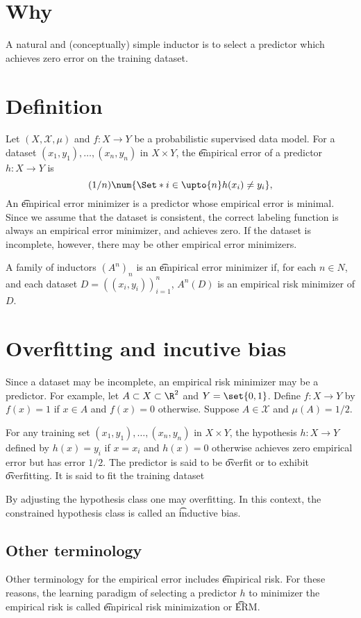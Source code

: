 

\section*{Why}

A natural and (conceptually) simple inductor is to select a predictor which achieves zero error on the training dataset.

\section*{Definition}

Let $(X, \mathcal{X} , \mu )$ and $f: X \to Y$ be a probabilistic supervised data model.
For a dataset $(x_1, y_1), \dots , (x_n, y_n)$ in $X \times Y$, the \t{empirical error} of a predictor $h: X \to Y$ is
    \[
(1/n)\num{\Set*{i \in \upto{n}}{h(x_i) \neq y_i}},
    \]
An \t{empirical error minimizer} is a predictor whose empirical error is minimal.
Since we assume that the dataset is consistent, the correct labeling function is always an empirical error minimizer, and achieves zero.
If the dataset is incomplete, however, there may be other empirical error minimizers.

A family of inductors $(A^n)_n$ is an \t{empirical error minimizer} if, for each $n \in N$, and each dataset $D = ((x_i, y_i))_{i = 1}^{n}$, $A^n(D)$ is an empirical risk minimizer of $D$.

\section*{Overfitting and incutive bias}

Since a dataset may be incomplete, an empirical risk minimizer may be a  predictor.
For example, let $A \subset X \subset \R ^2$ and $Y = \set{0, 1}$.
Define $f: X \to Y$ by $f(x) = 1$ if $x \in A$ and $f(x) = 0$ otherwise.
Suppose $A \in \mathcal{X} $ and $\mu (A) = 1/2$.

For any training set $(x_1, y_1), \dots , (x_n, y_n)$ in $X \times Y$, the hypothesis $h: X \to Y$ defined by $h(x) = y_i$ if $x = x_i$ and $h(x) = 0$ otherwise achieves zero empirical error but has  error $1/2$.
The predictor is said to be \t{overfit} or to exhibit \t{overfitting}.
It is said to fit the training dataset 

By adjusting the hypothesis class one may  overfitting.
In this context, the constrained hypothesis class is called an \t{inductive bias}.

\subsection*{Other terminology}

Other terminology for the empirical error includes \t{empirical risk}.
For these reasons, the learning paradigm of selecting a predictor $h$ to minimizer the empirical risk is called \t{empirical risk minimization} or \t{ERM}.
